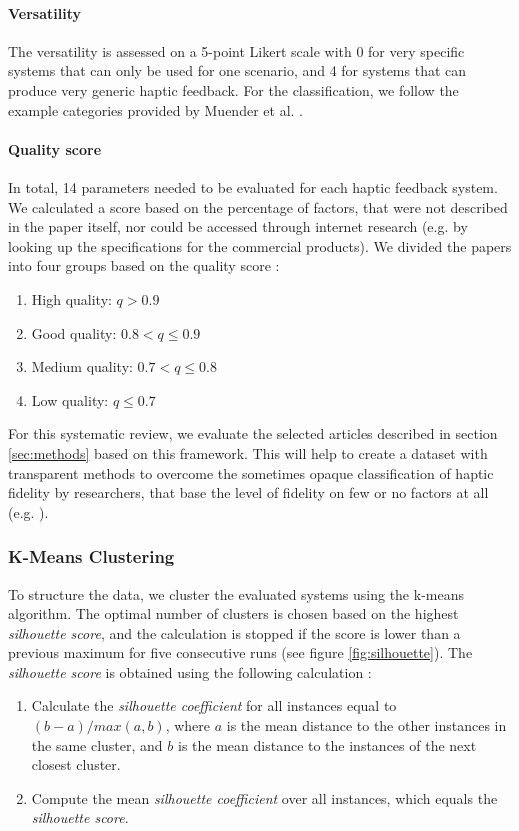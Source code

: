 \paragraph{Versatility}
The versatility is assessed on a 5-point Likert scale with 0 for very specific systems that can only be used for one scenario, and 4 for systems that can produce very generic haptic feedback. For the classification, we follow the example categories provided by Muender et al. \cite{Muender2022HapticReality}.


\paragraph{Quality score}
\label{sec:quality}
In total, 14 parameters needed to be evaluated for each haptic feedback system. We calculated a score based on the percentage of factors, that were not described in the paper itself, nor could be accessed through internet research (e.g. by looking up the specifications for the commercial products).
We divided the papers into four groups based on the quality score :

\begin{enumerate}
	\item High quality: $q > 0.9$
	\item Good quality: $0.8 < q \leq 0.9$
	\item Medium quality: $0.7 < q \leq 0.8$
	\item Low quality: $q \leq 0.7$
\end{enumerate} 

\vspace{5mm}
For this systematic review, we evaluate the selected articles described in section \ref{sec:methods}  based on this framework. This will help to create a dataset with transparent methods to overcome the sometimes opaque classification of haptic fidelity by researchers, that base the level of fidelity on few or no factors at all (e.g. \cite{Grant2019}). 


\subsubsection{K-Means Clustering}
To structure the data, we cluster the evaluated systems using the k-means algorithm. The optimal number of clusters is chosen based on the highest \textit{silhouette score}, and the calculation is stopped if the score is lower than a previous maximum for five consecutive runs (see figure \ref{fig:silhouette}). The \textit{silhouette score} is obtained using the following calculation \cite{Rousseeuw1987Silhouettes:Analysis}:
\begin{enumerate}
    \item Calculate the \textit{silhouette coefficient} for all instances equal to $(b-a) / max(a,b)$, where $a$ is the mean distance to the other instances in the same cluster, and $b$ is the mean distance to the instances of the next closest cluster.
    \item Compute the mean \textit{silhouette coefficient} over all instances, which equals the \textit{silhouette score}.
\end{enumerate}